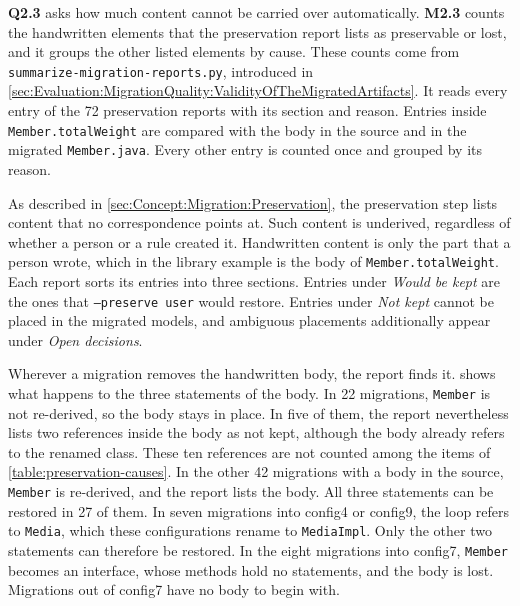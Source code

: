 \textbf{Q2.3} asks how much content cannot be carried over automatically.
\textbf{M2.3} counts the handwritten elements that the preservation report lists as preservable or lost, and it groups the other listed elements by cause.
These counts come from \texttt{summarize-migration-reports.py}, introduced in \autoref{sec:Evaluation:MigrationQuality:ValidityOfTheMigratedArtifacts}.
It reads every entry of the 72 preservation reports with its section and reason.
Entries inside \texttt{Member.totalWeight} are compared with the body in the source and in the migrated \texttt{Member.java}.
Every other entry is counted once and grouped by its reason.

As described in \autoref{sec:Concept:Migration:Preservation}, the preservation step lists content that no correspondence points at.
Such content is underived, regardless of whether a person or a rule created it.
Handwritten content is only the part that a person wrote, which in the library example is the body of \texttt{Member.totalWeight}.
Each report sorts its entries into three sections.
Entries under \textit{Would be kept} are the ones that \texttt{--preserve user} would restore.
Entries under \textit{Not kept} cannot be placed in the migrated models, and ambiguous placements additionally appear under \textit{Open decisions}.

Wherever a migration removes the handwritten body, the report finds it.
 shows what happens to the three statements of the body.
In 22 migrations, \texttt{Member} is not re-derived, so the body stays in place.
In five of them, the report nevertheless lists two references inside the body as not kept, although the body already refers to the renamed class.
These ten references are not counted among the items of \autoref{table:preservation-causes}.
In the other 42 migrations with a body in the source, \texttt{Member} is re-derived, and the report lists the body.
All three statements can be restored in 27 of them.
In seven migrations into config4 or config9, the loop refers to \texttt{Media}, which these configurations rename to \texttt{MediaImpl}.
Only the other two statements can therefore be restored.
In the eight migrations into config7, \texttt{Member} becomes an interface, whose methods hold no statements, and the body is lost.
Migrations out of config7 have no body to begin with.


